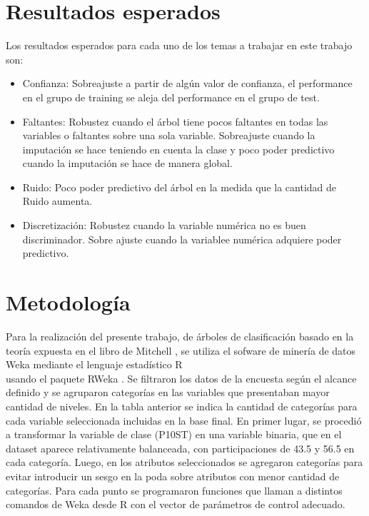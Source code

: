 \documentclass[]{article}
\begin{document}
\section*{Resultados esperados}
Los resultados esperados para cada uno de los temas a trabajar en este trabajo son:
\begin{itemize}
	\item Confianza: Sobreajuste a partir de algún valor de confianza, el performance en el grupo de training se aleja del performance en el grupo de test.
	\item Faltantes: Robustez cuando el árbol tiene pocos faltantes en todas las variables o faltantes sobre una sola variable. Sobreajuste cuando la imputación se hace teniendo en cuenta la clase y poco poder predictivo cuando la imputación se hace de manera global.
	\item Ruido: Poco poder predictivo del árbol en la medida que la cantidad de Ruido aumenta.
	\item Discretización: Robustez cuando la variable numérica no es buen discriminador. Sobre ajuste cuando la variablee numérica adquiere poder predictivo.
\end{itemize}

\section*{Metodología}
Para la realización del presente trabajo, de árboles de clasificación basado en la teoría expuesta en el libro de Mitchell \cite{Mitchell:1997:ML:541177}, se utiliza el sofware de minería de datos Weka \cite{Weka1} mediante el lenguaje estadístico R\\ \cite{RCran} usando el paquete RWeka \cite{RWeka}. Se filtraron los datos de la encuesta según el alcance definido y se agruparon categorías en las variables que presentaban mayor cantidad de niveles. En la tabla anterior se indica la cantidad de categorías para cada variable seleccionada incluidas en la base final. En primer lugar, se procedió a transformar la variable de clase (P10ST) en una variable binaria, que en el dataset aparece relativamente balanceada, con participaciones de 43.5 y 56.5 en cada categoría. Luego, en los atributos seleccionados se agregaron categorías para evitar introducir un sesgo en la poda sobre atributos con menor cantidad de categorías. Para cada punto se programaron funciones que llaman a distintos comandos de Weka desde R con el vector de parámetros de control adecuado.
\end{document}
